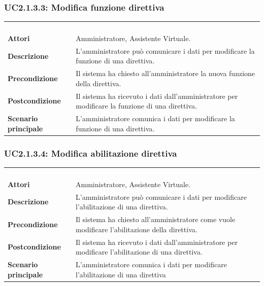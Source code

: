 \subsubsection{UC2.1.3.3: Modifica funzione direttiva}
\label{UC2.1.3.3}
\begin{longtable}{l|p{10cm}}
\rowcolor[gray]{0.8} \multicolumn{2}{c}{} \\
\rowcolor[gray]{0.8} \multicolumn{2}{c}{\textbf{UC2.1.3.3 - Modifica funzione direttiva}} \\
\rowcolor[gray]{0.8} \multicolumn{2}{c}{} \\
\hline
&\\
\textbf{Attori} & Amministratore, Assistente Virtuale.\\[7pt]
\textbf{Descrizione} & L'amministratore può comunicare i dati per modificare la funzione di una direttiva.\\[7pt]
\textbf{Precondizione} & Il sistema ha chiesto all'amministratore la nuova funzione della direttiva.\\[7pt]
\textbf{Postcondizione} & Il sistema ha ricevuto i dati dall'amministratore per modificare la funzione di una direttiva.\\[7pt]
\textbf{Scenario principale} &L'amministratore comunica i dati per modificare la funzione di una direttiva.\\[7pt]\hline
\end{longtable}

\subsubsection{UC2.1.3.4: Modifica abilitazione direttiva}
\label{UC2.1.3.4}
\begin{longtable}{l|p{10cm}}
\rowcolor[gray]{0.8} \multicolumn{2}{c}{} \\
\rowcolor[gray]{0.8} \multicolumn{2}{c}{\textbf{UC2.1.3.4 - Modifica abilitazione direttiva}} \\
\rowcolor[gray]{0.8} \multicolumn{2}{c}{} \\
\hline
&\\
\textbf{Attori} & Amministratore, Assistente Virtuale.\\[7pt]
\textbf{Descrizione} & L'amministratore può comunicare i dati per modificare l'abilitazione di una direttiva.\\[7pt]
\textbf{Precondizione} & Il sistema ha chiesto all'amministratore come vuole modificare l'abilitazione della direttiva.\\[7pt]
\textbf{Postcondizione} & Il sistema ha ricevuto i dati dall'amministratore per modificare l'abilitazione di una direttiva.\\[7pt]
\textbf{Scenario principale} &L'amministratore comunica i dati per modificare l'abilitazione di una direttiva\\[7pt]\hline
\end{longtable}


